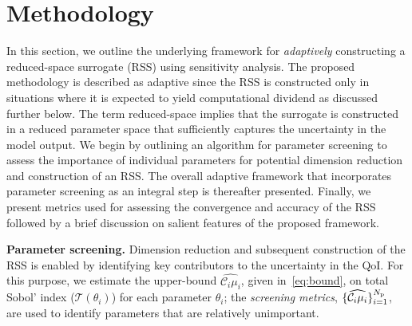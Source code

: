 \section{Methodology}
\label{sec:method}

%

In this section, we outline the underlying framework for \emph{adaptively}
constructing a reduced-space surrogate (RSS) using sensitivity analysis.  The
proposed methodology is described as adaptive since the RSS is constructed only
in situations where it is expected to yield computational dividend as discussed
further below.  The term reduced-space implies that the surrogate is
constructed in a reduced parameter space that sufficiently captures the uncertainty in the
model output. We begin by outlining an algorithm for parameter screening
to assess the importance of individual parameters for potential dimension
reduction and construction of an RSS. The overall adaptive framework 
that incorporates parameter screening as an integral step is thereafter
presented. Finally, we present metrics used for assessing the
convergence and accuracy of the RSS followed by a brief discussion on
salient features of the proposed framework. 

\textbf{Parameter screening.}
Dimension reduction and subsequent construction of the RSS is enabled by
identifying key contributors to the uncertainty in the QoI. For this purpose,
we estimate the 
upper-bound $\widehat{\mathcal{C}_i\mu_i}$, given in~\eqref{eq:bound}, on 
total Sobol' index ($\mathcal{T}(\theta_i)$) for each 
parameter $\theta_i$; the \emph{screening metrics}, 
$\{\widehat{\mathcal{C}_i\mu_i}\}_{i=1}^{N_\text{p}}$,  
are used to identify
parameters that are relatively unimportant. 


